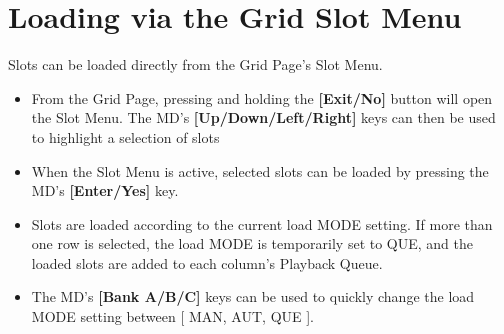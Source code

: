 \section{Loading via the Grid Slot Menu}
Slots can be loaded directly from the Grid Page's Slot Menu.
\begin{itemize}
\item From the Grid Page, pressing and holding the \textbf{[Exit/No]} button will open the Slot Menu. The MD's \textbf{[Up/Down/Left/Right]} keys can then be used to highlight a selection of slots
\item When the Slot Menu is active, selected slots can be loaded by pressing the MD's \textbf{[Enter/Yes]} key.
\item Slots are loaded according to the current load MODE setting. If more than one row is selected, the load MODE is temporarily set to QUE, and the loaded slots are added to each column's Playback Queue.
\item The MD's \textbf{[Bank A/B/C]} keys can be used to quickly change the load MODE setting between [ MAN, AUT, QUE ].
\end{itemize}
